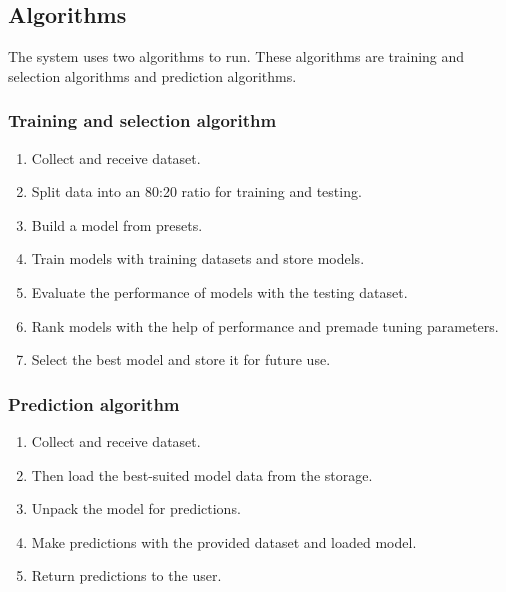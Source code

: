 \documentclass[a4paper,fleqn]{cas-dc}
\begin{document}
\subsection{Algorithms}\label{subsec:algorithms}

The system uses two algorithms to run. These algorithms are training and selection algorithms and prediction algorithms.

\vspace{-0.5em}

\subsubsection{Training and selection algorithm}\label{subsubsec:training_and_selection_algorithm}
\vspace{0.5em}
\begin{enumerate}
    \item Collect and receive dataset.
    \item Split data into an 80:20 ratio for training and testing.
    \item Build a model from presets.
    \item Train models with training datasets and store models.
    \item Evaluate the performance of models with the testing dataset.
    \item Rank models with the help of performance and premade tuning parameters.
    \item Select the best model and store it for future use.
\end{enumerate}

\vspace{-0.5em}

\subsubsection{Prediction algorithm}\label{subsubsec:prediction_algorithm}
\vspace{0.5em}
\begin{enumerate}
    \item Collect and receive dataset.
    \item Then load the best-suited model data from the storage.
    \item Unpack the model for predictions.
    \item Make predictions with the provided dataset and loaded model.
    \item Return predictions to the user.
\end{enumerate}
\end{document}
